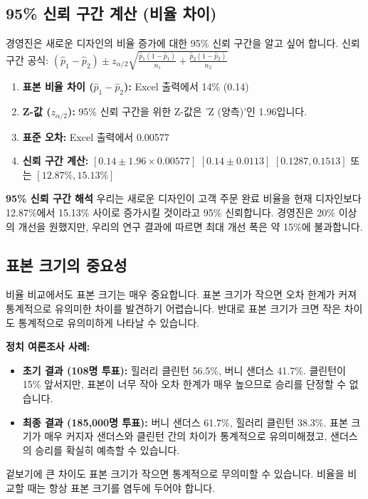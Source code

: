 \documentclass[11pt,a4paper]{article}
\begin{document}
\subsection*{95\% 신뢰 구간 계산 (비율 차이)}
경영진은 새로운 디자인의 비율 증가에 대한 95\% 신뢰 구간을 알고 싶어 합니다.
신뢰 구간 공식: $(\hat{p}_1 - \hat{p}_2) \pm z_{\alpha/2} \sqrt{\frac{\hat{p}_1(1-\hat{p}_1)}{n_1} + \frac{\hat{p}_2(1-\hat{p}_2)}{n_2}}$

\begin{enumerate}
    \item \textbf{표본 비율 차이 ($\hat{p}_1 - \hat{p}_2$):}
    Excel 출력에서 14\% (0.14)
    \item \textbf{Z-값 ($z_{\alpha/2}$):}
    95\% 신뢰 구간을 위한 Z-값은 'Z (양측)'인 1.96입니다.
    \item \textbf{표준 오차:}
    Excel 출력에서 0.00577
    \item \textbf{신뢰 구간 계산:}
    $[0.14 \pm 1.96 \times 0.00577]$
    $[0.14 \pm 0.0113]$
    $[0.1287, 0.1513]$ 또는 $[12.87\%, 15.13\%]$
\end{enumerate}

\begin{summarybox}
\textbf{95\% 신뢰 구간 해석}
우리는 새로운 디자인이 고객 주문 완료 비율을 현재 디자인보다 12.87\%에서 15.13\% 사이로 증가시킬 것이라고 95\% 신뢰합니다. 경영진은 20\% 이상의 개선을 원했지만, 우리의 연구 결과에 따르면 최대 개선 폭은 약 15\%에 불과합니다.
\end{summarybox}

\subsection*{표본 크기의 중요성}
비율 비교에서도 표본 크기는 매우 중요합니다. 표본 크기가 작으면 오차 한계가 커져 통계적으로 유의미한 차이를 발견하기 어렵습니다. 반대로 표본 크기가 크면 작은 차이도 통계적으로 유의미하게 나타날 수 있습니다.

\begin{examplebox}
\textbf{정치 여론조사 사례:}
\begin{itemize}
    \item \textbf{초기 결과 (108명 투표):} 힐러리 클린턴 56.5\%, 버니 샌더스 41.7\%. 클린턴이 15\% 앞서지만, 표본이 너무 작아 오차 한계가 매우 높으므로 승리를 단정할 수 없습니다.
    \item \textbf{최종 결과 (185,000명 투표):} 버니 샌더스 61.7\%, 힐러리 클린턴 38.3\%. 표본 크기가 매우 커지자 샌더스와 클린턴 간의 차이가 통계적으로 유의미해졌고, 샌더스의 승리를 확실히 예측할 수 있습니다.
\end{itemize}
겉보기에 큰 차이도 표본 크기가 작으면 통계적으로 무의미할 수 있습니다. 비율을 비교할 때는 항상 표본 크기를 염두에 두어야 합니다.
\end{examplebox}
\end{document}
